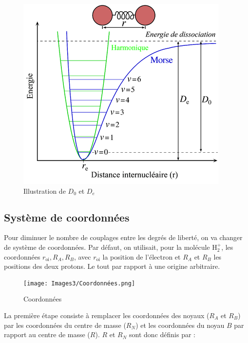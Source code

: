 \begin{figure}[htpb]
    \centering
    \includegraphics[scale=0.80]{Images3/400px-Morse-potential-fr.png}
    \caption{Illustration de $D_0$ et $D_e$}
\end{figure}


\subsection{Système de coordonnées}
Pour diminuer le nombre de couplages entre les degrés de liberté, on va changer de système de coordonnées. Par défaut, on utilisait, pour la molécule H$^+_2$, les coordonnées $r_\text{oi}, R_A, R_B$, avec $r_\text{oi}$ la position de l'électron et $R_A$ et $R_B$ les positions des deux protons. Le tout par rapport à une origine arbitraire.


\begin{figure}[htpb]
    \centering
    \texttt{[image: Images3/Coordonnées.png]}
    \caption{Coordonnées}
\end{figure}


La première étape consiste à remplacer les coordonnées des noyaux ($R_A$ et $R_B$) par les coordonnées du centre de masse ($R_N$) et les coordonnées du noyau $B$ par rapport au centre de masse ($R$). $R$ et $R_N$ sont donc définis par :


